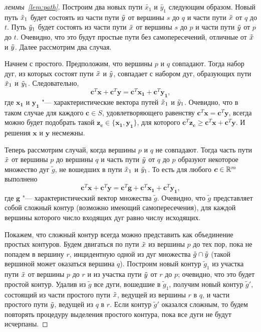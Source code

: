 \begin{proof}[леммы~\ref{lem:path}]
Построим два новых пути $\tilde{x_1}$ и $\tilde{y_1}$ следующим
образом. 
Новый путь $\tilde x_1$ будет состоять из части пути $\tilde y$ от вершины $s$ до $q$
и части пути $\tilde x$ от $q$ до $t$.
Путь $\tilde y_1$ будет состоять из части пути $\tilde x$ от вершины $s$ до $p$
и части пути $\tilde y$ от $p$ до $t$. Очевидно, что это будут простые пути без самопересечений, отличные от $\tilde x$ и $\tilde y$. Далее рассмотрим два случая.

Начнем с простого. Предположим, что вершины $p$ и $q$ 
совпадают. Тогда набор дуг, из которых состоят пути $\tilde x$ и $\tilde y$,
совпадает с набором дуг, образующих пути $\tilde x_1$ и $\tilde y_1$.
Следовательно,
\[
\bm{c}^T \bm{x} + \bm{c}^T \bm{y} = \bm{c}^T \bm{x_1} + \bm{c}^T \bm{y_1},
\]
где $\bm{x_1}$ и $\bm{y_1}$ "--- характеристические вектора путей $\tilde x_1$ и $\tilde y_1$.
Очевидно, что в таком случае для каждого $\bm{c}\in S$, удовлетворяющего
равенству $\bm{c}^T \bm{x} = \bm{c}^T \bm{y}$, всегда можно будет подобрать такой 
$\bm{z_c} \in \{\bm{x_1}, \bm{y_1}\}$, для которого $\bm{c}^T \bm{z_c} \ge \bm{c}^T \bm{x} + \bm{c}^T \bm{y}$. 
И решения $\bm{x}$ и $\bm{y}$ несмежны.

Теперь рассмотрим случай, когда вершины $p$ и $q$ не совпадают. Тогда часть пути $\tilde x$ от вершины $p$ до вершины $q$ и часть пути $\tilde y$ от $q$ до $p$ 
образуют некоторое множество дуг $\tilde g$, не вошедших в пути $\tilde x_1$ и $\tilde y_1$. То есть для любого $\bm{c} \in \mathbb{R}^m$ выполнено
\begin{equation*}
\bm{c}^T \bm{x} + \bm{c}^T \bm{y} = \bm{c}^T \bm{g} + \bm{c}^T \bm{x_1} + \bm{c}^T \bm{y_1},
\end{equation*}
где $\bm{g}$ "--- характеристический вектор множества $\tilde g$.
Очевидно, что $\tilde g$ представляет собой сложный контур 
(возможно имеющий самопересечения), для каждой вершины которого число входящих дуг равно числу исходящих.

Покажем, что сложный контур всегда можно представить как объединение
простых контуров. Будем двигаться по пути $\tilde x$ из вершины $p$ до тех пор,
пока не попадем в вершину $r$, инцидентную одной из дуг множества $\tilde g \cap \tilde y$ (такой вершиной может оказаться вершина $q$).
Построим новый контур $\tilde g_1$ из участка пути $\tilde x$ 
от вершины $p$ до $r$ и из участка пути $\tilde y$ от $r$ до $p$; 
очевидно, что это будет простой контур. 
Удалив из $\tilde g$ все дуги, вошедшие в $\tilde g_1$, 
получим новый контур $\tilde g'$, состоящий из части простого пути 
$\tilde x$, ведущей из вершины $r$ в $q$, и части простого пути $\tilde y$,
ведущей из $q$ в $r$. Если контур $\tilde g'$ оказался сложным, 
то будем повторять процедуру выделения простого контура, пока все дуги не будут исчерпаны. 


\end{proof}
